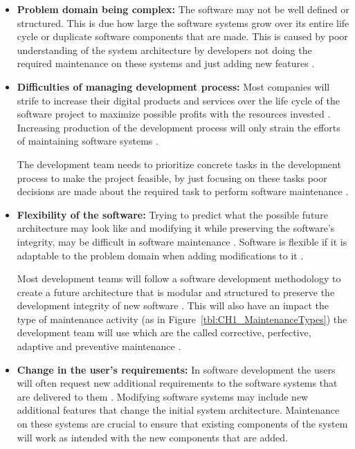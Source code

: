 \begin{itemize}
	\item \textbf{Problem domain being complex:} The software may not be well defined or structured. This is due how large the software systems grow over its entire life cycle or duplicate software components that are made. This is caused by poor understanding of the system architecture by developers not doing the required maintenance on these systems and just adding new features \cite{Galster2019, Booch1986}.
	\item \textbf{Difficulties of managing development process:} Most companies will strife to increase their digital products and services over the life cycle of the software project to maximize possible profits with the resources invested \cite{Niu2018}. Increasing production of the development process will only strain the efforts of maintaining software systems \cite{Sneed2004}.\par The development team needs to prioritize concrete tasks in the development process to make the project feasible, by just focusing on these tasks poor decisions are made about the required task to perform software maintenance \cite{Galster2019, Ogheneovo2014, Lenarduzzi2017}. 
	\item \textbf{Flexibility of the software:} Trying to predict what the possible future architecture may look like and modifying it while preserving the software's integrity, may be difficult in software maintenance \cite{Garlan1999}. Software is flexible if it is adaptable to the problem domain when adding modifications to it \cite{Ogheneovo2014}.\par Most development teams will follow a software development methodology to create a future architecture that is modular and structured to preserve the development integrity of new software \cite{Vijayasarathy2016, Rehman2018}. This will also have an impact the type of maintenance activity (as in Figure~\ref{tbl:CH1_MaintenanceTypes}) the development team will use which are the called corrective, perfective, adaptive and preventive maintenance \cite{FrancisThamburaj2017, Hasan2012, Stojanov2017, Snipes2018}.
	\item \textbf{Change in the user's requirements:} In software development the users will often request new additional requirements to the software systems that are delivered to them \cite{Ogheneovo2014}. Modifying software systems may include new additional features that change the initial system architecture. Maintenance on these systems are crucial to ensure that existing components of the system will work as intended with the new components that are added.
\end{itemize}


